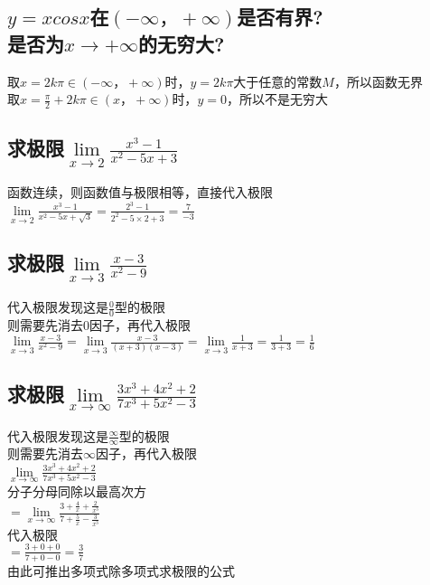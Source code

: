\documentclass{article}
\begin{document}
\begin{flushleft}
\subsection{
$y=xcosx$在$(-\infty，+\infty)$是否有界?\\
是否为$x\to +\infty$的无穷大?
}
取$x=2k\pi\in(-\infty，+\infty)$时，$y=2k\pi$大于任意的常数$M$，所以函数无界\\
取$x=\frac{\pi}{2}+2k\pi\in(x，+\infty)$时，$y=0$，所以不是无穷大\\

\subsection{
求极限$\lim\limits_{x\to 2}\frac{x^3-1}{x^2-5x+3}$
}
函数连续，则函数值与极限相等，直接代入极限\\
$\lim\limits_{x\to 2}\frac{x^3-1}{x^2-5x+\sqrt3}=\frac{2^3-1}{2^2-5\times2+3}=\frac{7}{-3}$\\

\subsection{
求极限$\lim\limits_{x\to 3}\frac{x-3}{x^2-9}$
}
代入极限发现这是$\frac{0}{0}$型的极限\\
则需要先消去$0$因子，再代入极限\\
$\lim\limits_{x\to 3}\frac{x-3}{x^2-9}=\lim\limits_{x\to 3}\frac{x-3}{(x+3)(x-3)}=\lim\limits_{x\to 3}\frac{1}{x+3}=\frac{1}{3+3}=\frac{1}{6}$\\

\subsection{
求极限$\lim\limits_{x\to \infty}\frac{3x^3+4x^2+2}{7x^3+5x^2-3}$
}
代入极限发现这是$\frac{\infty}{\infty}$型的极限\\
则需要先消去$\infty$因子，再代入极限\\
$\lim\limits_{x\to \infty}\frac{3x^3+4x^2+2}{7x^3+5x^2-3}$\\
分子分母同除以最高次方\\
$=\lim\limits_{x\to \infty}\frac{3+\frac{4}{x}+\frac{2}{x^3}}{7+\frac{5}{x}-\frac{3}{x^3}}$\\
代入极限\\
$=\frac{3+0+0}{7+0-0}=\frac{3}{7}$\\
由此可推出多项式除多项式求极限的公式\\


\end{flushleft}
\end{document}
